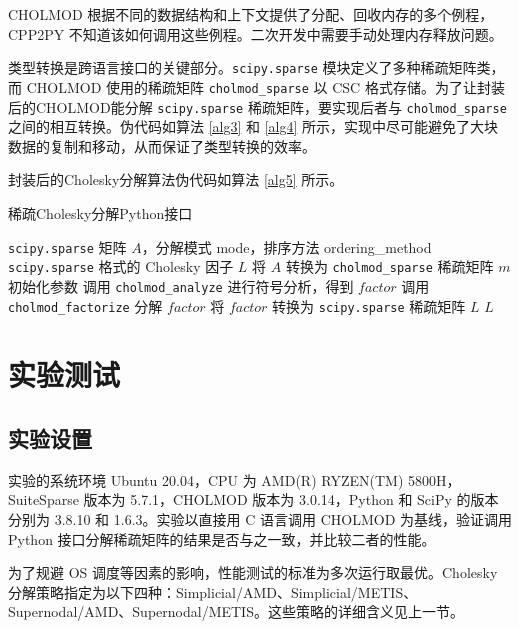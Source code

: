 CHOLMOD 根据不同的数据结构和上下文提供了分配、回收内存的多个例程，CPP2PY 不知道该如何调用这些例程。二次开发中需要手动处理内存释放问题。

类型转换是跨语言接口的关键部分。\lstinline{scipy.sparse} 模块定义了多种稀疏矩阵类，而 CHOLMOD 使用的稀疏矩阵 \lstinline{cholmod_sparse} 以 CSC 格式存储。为了让封装后的CHOLMOD能分解 \lstinline{scipy.sparse} 稀疏矩阵，要实现后者与 \lstinline{cholmod_sparse} 之间的相互转换。伪代码如算法 \ref{alg3} 和 \ref{alg4} 所示，实现中尽可能避免了大块数据的复制和移动，从而保证了类型转换的效率。

封装后的Cholesky分解算法伪代码如算法 \ref{alg5} 所示。

\begin{algorithm}
  \caption{稀疏Cholesky分解Python接口}
  \label{alg5}
  \small
  \begin{algorithmic}
  \REQUIRE \lstinline$scipy.sparse$ 矩阵 $A$，分解模式 mode，排序方法 ordering\_method
  \ENSURE \lstinline$scipy.sparse$ 格式的 Cholesky 因子 $L$
  \STATE 将 $A$ 转换为 \lstinline$cholmod_sparse$ 稀疏矩阵 $m$
  \STATE 初始化参数
  \STATE 调用 \lstinline$cholmod_analyze$ 进行符号分析，得到 $factor$
  \STATE 调用 \lstinline$cholmod_factorize$ 分解 $factor$
  \STATE 将 $factor$ 转换为 \lstinline$scipy.sparse$ 稀疏矩阵 $L$
  \RETURN $L$
  \end{algorithmic}
\end{algorithm}

\section{实验测试}

\subsection{实验设置}

实验的系统环境 Ubuntu 20.04，CPU 为 AMD(R) RYZEN(TM) 5800H，SuiteSparse 版本为 5.7.1，CHOLMOD 版本为 3.0.14，Python 和 SciPy 的版本分别为 3.8.10 和 1.6.3。实验以直接用 C 语言调用 CHOLMOD 为基线，验证调用 Python 接口分解稀疏矩阵的结果是否与之一致，并比较二者的性能。

为了规避 OS 调度等因素的影响，性能测试的标准为多次运行取最优。Cholesky 分解策略指定为以下四种：Simplicial/AMD、Simplicial/METIS、Supernodal/AMD、Supernodal/METIS。这些策略的详细含义见上一节。

